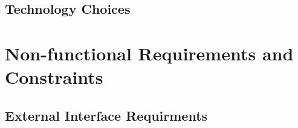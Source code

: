 \documentclass{article}
\begin{document}
		\clearpage
	
		\subsection{Technology Choices}\label{sec:technology-choices}
	
		
		\clearpage
		
	\section{Non-functional Requirements and Constraints}\label{sec: non-functional-requirments}
	
		\subsection{External Interface Requirments}\label{sec:external-inteface-requirments}
\end{document}
